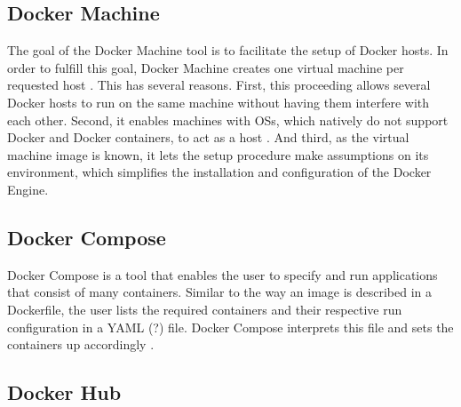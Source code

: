 
  \subsection{Docker Machine} %
  \label{sub:docker_machine}
    The goal of the Docker Machine tool is to facilitate the setup of Docker hosts. In order to fulfill this goal, Docker Machine creates one virtual machine per requested host \cite{Docker????Dockerb,Docker????Dockera}. This has several reasons. First, this proceeding allows several Docker hosts to run on the same machine without having them interfere with each other. Second, it enables machines with \acp{OS}, which natively do not support Docker and Docker containers, to act as a host \cite{Docker????Dockera}. And third, as the virtual machine image is known, it lets the setup procedure make assumptions on its environment, which simplifies the installation and configuration of the Docker Engine.

  \subsection{Docker Compose} %
  \label{sub:docker_compose}
    Docker Compose is a tool that enables the user to specify and run applications that consist of many containers. Similar to the way an image is described in a Dockerfile, the user lists the required containers and their respective run configuration in a YAML (?) file. Docker Compose interprets this file and sets the containers up accordingly \cite{Docker????Dockerb}.


  \subsection{Docker Hub} %
  \label{sub:docker_hub}


